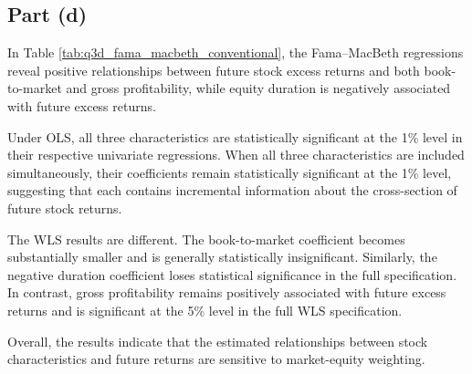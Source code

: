 \documentclass[11pt]{article}
\begin{document}
\subsection{Part (d)}
In Table \ref{tab:q3d_fama_macbeth_conventional}, the Fama–MacBeth regressions reveal positive relationships between future stock excess returns and both book-to-market and gross profitability, while equity duration is negatively associated with future excess returns.

Under OLS, all three characteristics are statistically significant at the 1\% level in their respective univariate regressions. When all three characteristics are included simultaneously, their coefficients remain statistically significant at the 1\% level, suggesting that each contains incremental information about the cross-section of future stock returns.

The WLS results are different. The book-to-market coefficient becomes substantially smaller and is generally statistically insignificant. Similarly, the negative duration coefficient loses statistical significance in the full specification. In contrast, gross profitability remains positively associated with future excess returns and is significant at the 5\% level in the full WLS specification.

Overall, the results indicate that the estimated relationships between stock characteristics and future returns are sensitive to market-equity weighting. 
\end{document}
